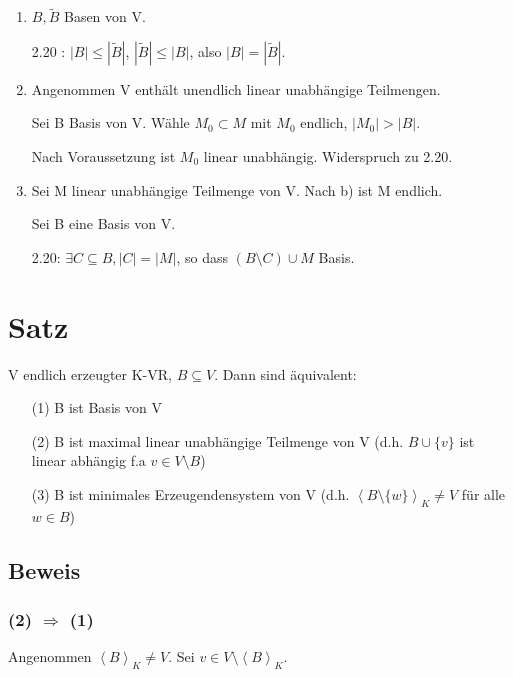 \documentclass[a4paper, openany]{book}
\begin{document}
    \begin{enumerate}[label=(\alph*)]
      \item $B, \tilde{B}$ Basen von V.

      2.20 : $|B| \le |\tilde{B}|$, $|\tilde{B}| \le |B|$, also $|B| = |\tilde{B}|$.

      \item Angenommen V enthält unendlich linear unabhängige Teilmengen.

      Sei B Basis von V. Wähle $M_0 \subset M$ mit $M_0$ endlich, $|M_0| > |B|$.

      Nach Voraussetzung ist $M_0$ linear unabhängig. Widerspruch zu 2.20.

      \item Sei M linear unabhängige Teilmenge von V. Nach b) ist M endlich.

      Sei B eine Basis von V.

      2.20: $\exists C \subseteq B, |C| = |M|$, so dass $(B \setminus C) \cup M$ Basis.
    \end{enumerate}

    \section{Satz}

    V endlich erzeugter K-VR, $B \subseteq V$. Dann sind äquivalent: 

    \begin{enumerate}
      \item[(1)] B ist Basis von V
      \item[(2)] B ist maximal linear unabhängige Teilmenge von V (d.h. $B \cup \{v\}$ ist linear abhängig f.a $v \in V \setminus B$)
      \item[(3)] B ist minimales Erzeugendensystem von V (d.h. $\left \langle B \setminus \{w\} \right \rangle_K \neq V$ für alle $w \in B$)
    \end{enumerate}

    \subsection{Beweis}

    \subsubsection*{(2) $\Rightarrow$ (1)}

    Angenommen $\left \langle B \right \rangle_K \neq V$. Sei $v \in V \setminus \left \langle B \right \rangle_K$.
\end{document}
